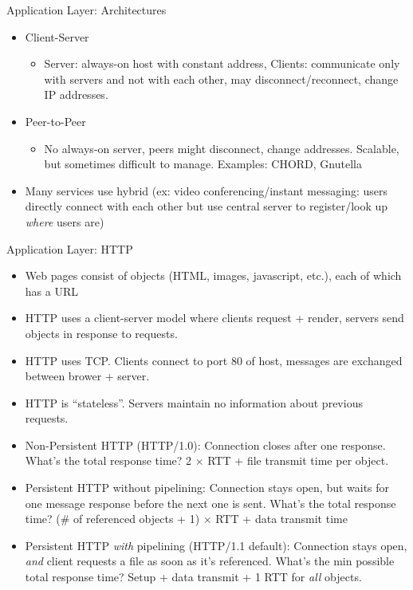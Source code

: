 \documentclass{beamer}
\begin{document}
\begin{frame}[t]{Application Layer: Architectures}
    \begin{itemize}
        \item \alert{Client-Server}
        \begin{itemize}
            \item Server: always-on host with constant address, Clients: communicate only with servers and not with each other, may disconnect/reconnect, change IP addresses.
        \end{itemize}
        \item \pause \alert{Peer-to-Peer}
        \begin{itemize}
            \item No always-on server, peers might disconnect, change addresses. Scalable, but sometimes difficult to manage. Examples: CHORD, Gnutella
        \end{itemize}
        \item \pause  Many services use hybrid (ex: video conferencing/instant messaging: users directly connect with each other but use central server to register/look up \textit{where} users are)
    \end{itemize}
\end{frame}

\begin{frame}[t]{Application Layer: HTTP}
   \begin{itemize}
       \item Web pages consist of \alert{objects} (HTML, images, javascript, etc.), each of which has a URL
       \item \pause  \alert{HTTP uses a client-server model} where clients request + render, servers send objects in response to requests.
       \item \pause \alert{HTTP uses TCP}. Clients connect to port 80 of host, messages are exchanged between brower + server.
       \item \pause \alert{HTTP is ``stateless''}. Servers maintain no information about previous requests.
       \item \pause \alert{Non-Persistent HTTP} (HTTP/1.0): Connection closes after one response. What's the total response time? \pause \alert{2 $\times$ RTT + file transmit time} per object.
       \item \pause \alert{Persistent HTTP without pipelining}: Connection stays open, but waits for one message response before the next one is sent. What's the total response time? \pause \alert{(\# of referenced objects + 1) $\times$ RTT + data transmit time}
       \item \pause \alert{Persistent HTTP \textit{with} pipelining} (HTTP/1.1 default): Connection stays open, \textit{and} client requests a file as soon as it's referenced. What's the min possible total response time? \pause \alert{Setup + data transmit + 1 RTT for \textit{all} objects}.
   \end{itemize} 
\end{frame}
\end{document}

